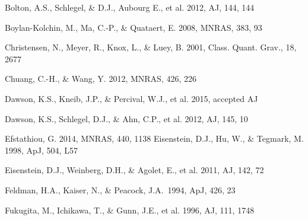 \documentclass[iop]{emulateapj}
\begin{document}
\begin{thebibliography}{}
Bolton, A.S., Schlegel, \& D.J., Aubourg E., et al. 2012, AJ, 144, 144

Boylan-Kolchin, M., Ma, C.-P., \& Quataert, E. 2008, MNRAS, 383, 93






Christensen, N., Meyer, R., Knox, L., \& Luey, B. 2001, Class. Quant. Grav., 18, 2677


Chuang, C.-H., \& Wang, Y. 2012, MNRAS, 426, 226  



Dawson, K.S., Kneib, J.P., \& Percival, W.J., et al. 2015, accepted AJ

Dawson, K.S., Schlegel, D.J., \& Ahn, C.P., et al. 2012, AJ, 145, 10

Efstathiou, G. 2014, MNRAS, 440, 1138
Eisenstein, D.J., Hu, W., \& Tegmark, M. 1998, ApJ, 504, L57


Eisenstein, D.J.,  Weinberg, D.H., \& Agolet, E., et al. 2011, AJ, 142, 72





Feldman, H.A., Kaiser, N., \& Peacock, J.A.\ 1994, ApJ, 426, 23 

Fukugita, M., Ichikawa, T., \& Gunn, J.E., et al. 1996, AJ, 111, 1748


\end{thebibliography}
\end{document}

